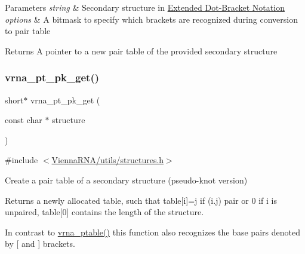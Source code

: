 \begin{DoxyParams}{Parameters}
{\em string} & Secondary structure in \hyperlink{rna_structure_notations_dot-bracket-ext-notation}{Extended Dot-\/\+Bracket Notation} \\
\hline
{\em options} & A bitmask to specify which brackets are recognized during conversion to pair table \\
\hline
\end{DoxyParams}
\begin{DoxyReturn}{Returns}
A pointer to a new pair table of the provided secondary structure 
\end{DoxyReturn}
\mbox{\label{group__struct__utils__pair__table_gacca520048b24ec5a8978f4dafb4e4bf8}} 
\subsubsection{\texorpdfstring{vrna\+\_\+pt\+\_\+pk\+\_\+get()}{vrna\_pt\_pk\_get()}}
{\footnotesize\ttfamily short$\ast$ vrna\+\_\+pt\+\_\+pk\+\_\+get (\begin{DoxyParamCaption}\item[{const char $\ast$}]{structure }\end{DoxyParamCaption})}



{\ttfamily \#include $<$\hyperlink{utils_2structures_8h}{Vienna\+R\+N\+A/utils/structures.\+h}$>$}



Create a pair table of a secondary structure (pseudo-\/knot version) 

Returns a newly allocated table, such that table\mbox{[}i\mbox{]}=j if (i.\+j) pair or 0 if i is unpaired, table\mbox{[}0\mbox{]} contains the length of the structure.

In contrast to \hyperlink{group__struct__utils__pair__table_gae829fb8bb7f694c12a9c0bbc34c77c60}{vrna\+\_\+ptable()} this function also recognizes the base pairs denoted by \textquotesingle{}\mbox{[}\textquotesingle{} and \textquotesingle{}\mbox{]}\textquotesingle{} brackets.


